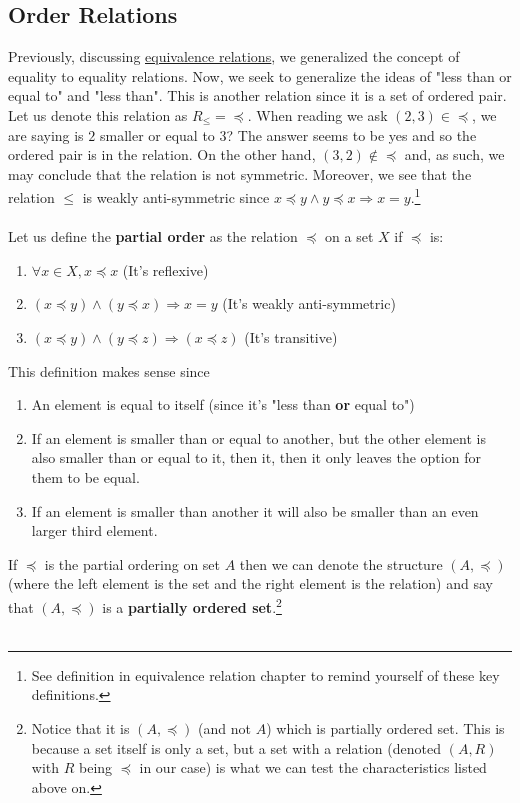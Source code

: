 \documentclass{tufte-handout} %
\theoremstyle{definition}
\theoremstyle{remark}
\begin{document}
\subsection{Order Relations}
Previously, discussing \hyperref[subsec:equivalence-relations]{\underline{equivalence relations}}, we generalized the concept of equality to equality relations. Now, we seek to generalize the ideas of "less than or equal to" and "less than". This is another relation since it is a set of ordered pair. Let us denote this relation as $R_{\leq} = \preccurlyeq$. When reading we ask $(2,3)\in \preccurlyeq$, we are saying is $2$ smaller or equal to $3$? The answer seems to be yes and so the ordered pair is in the relation. On the other hand, $(3,2)\not\in \preccurlyeq$ and, as such, we may conclude that the relation is not symmetric. Moreover, we see that the relation $\leq$ is weakly anti-symmetric since $x\preccurlyeq y \land y\preccurlyeq x \Rightarrow x=y$.\footnote{See definition in equivalence relation chapter to remind yourself of these key definitions.} \\\\
Let us define the \textbf{partial order} as the relation $\preccurlyeq$ on a set $X$ if $\preccurlyeq$ is:
\begin{enumerate}
    \item $\forall x\in X, x \preccurlyeq x$ (It's reflexive) 
    \item $(x \preccurlyeq y) \land (y \preccurlyeq x) \Rightarrow x=y$ (It's weakly anti-symmetric) 
    \item $(x \preccurlyeq y) \land (y \preccurlyeq z) \Rightarrow (x \preccurlyeq z)$ (It's transitive)
\end{enumerate}
This definition makes sense since 
\begin{enumerate}
    \item An element is equal to itself (since it's "less than \textbf{or} equal to")
    \item If an element is smaller than or equal to another, but the other element is also smaller than or equal to it, then it, then it only leaves the option for them to be equal.
    \item If an element is smaller than another it will also be smaller than an even larger third element.
\end{enumerate}
If $\preccurlyeq$ is the partial ordering on set $A$ then we can denote the structure $(A, \preccurlyeq)$ (where the left element is the set and the right element is the relation) and say that $(A,\preccurlyeq)$ is a \textbf{partially ordered set}.\footnote{Notice that it is $(A,\preccurlyeq)$ (and not $A$) which is partially ordered set. This is because a set itself is only a set, but a set with a relation (denoted $(A,R)$ with $R$ being $\preccurlyeq$ in our case) is what we can test the characteristics listed above on.} \\\\
\end{document}
